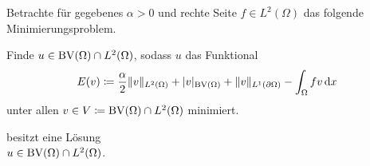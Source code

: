 Betrachte für gegebenes $\alpha>0$ und rechte Seite $f\in L^2(\Omega)$ das 
folgende Minimierungsproblem. 

\begin{problem}\label{prob:continuousProblem}
  Finde $u\in \textup{BV}(\Omega)\cap L^2(\Omega)$, sodass
  $u$ das Funktional
  \begin{align}\label{eq:continuousProblem}
    E(v)\coloneqq \frac{\alpha}{2}\Vert v\Vert_{L^2(\Omega)} + |v|_{\textup{BV}(\Omega)}
    +\Vert v\Vert_{L^1(\partial\Omega)}-\int_\Omega fv\,\mathrm{d}x
  \end{align}
  unter allen $v\in V\coloneqq\textup{BV}(\Omega)\cap L^2(\Omega)$ minimiert.
\end{problem}

\begin{theorem}
  \label{thm:contProblemExistence}
   besitzt eine Lösung \\$u\in\textup{BV}(\Omega)\cap
  L^2(\Omega)$.
\end{theorem}

